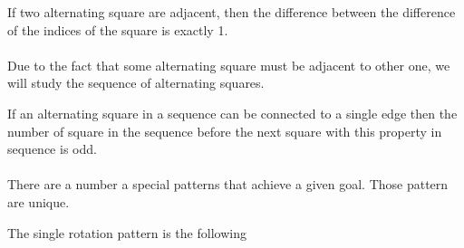 \begin{corollary}
  If two alternating square are adjacent, then the difference between the difference of the indices of the square is exactly 1.
\end{corollary}

\paragraph{}
Due to the fact that some alternating square must be adjacent to other one, we will study the sequence of alternating squares.

\begin{corollary}
  \label{parity-sequence-squares}
  If an alternating square in a sequence can be connected to a single edge then the number of square in the sequence before the next square with this property in sequence is odd.
\end{corollary}

\paragraph{}
There are a number a special patterns that achieve a given goal. Those pattern are unique.

\begin{proposition}
  \label{rotation-pattern}
  The single rotation pattern is the following

  \begin{figure}[H]
    \begin{center}
      \caption{}
    \end{center}
  \end{figure}

\end{proposition}

